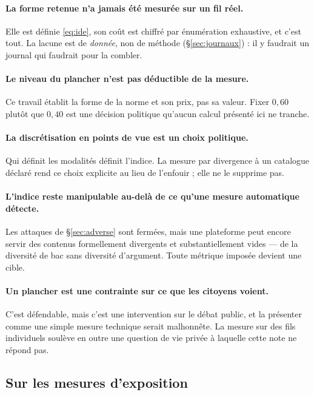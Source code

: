 \documentclass[11pt,a4paper]{article}
\begin{document}
\paragraph{La forme retenue n'a jamais été mesurée sur un fil réel.} Elle est définie
\eqref{eq:ide}, son coût est chiffré par énumération exhaustive, et c'est tout. La lacune est
de \emph{donnée}, non de méthode (\S\ref{sec:journaux}) : il y faudrait un journal qui
faudrait pour la combler.

\paragraph{Le niveau du plancher n'est pas déductible de la mesure.} Ce travail établit la
forme de la norme et son prix, pas sa valeur. Fixer $0{,}60$ plutôt que $0{,}40$ est une
décision politique qu'aucun calcul présenté ici ne tranche.

\paragraph{La discrétisation en points de vue est un choix politique.} Qui définit les
modalités définit l'indice. La mesure par divergence à un catalogue déclaré rend ce choix
explicite au lieu de l'enfouir ; elle ne le supprime pas.

\paragraph{L'indice reste manipulable au-delà de ce qu'une mesure automatique détecte.} Les
attaques de \S\ref{sec:adverse} sont fermées, mais une plateforme peut encore servir des
contenus formellement divergents et substantiellement vides --- de la diversité de bac sans
diversité d'argument. Toute métrique imposée devient une cible.

\paragraph{Un plancher est une contrainte sur ce que les citoyens voient.} C'est défendable,
mais c'est une intervention sur le débat public, et la présenter comme une simple mesure
technique serait malhonnête. La mesure sur des fils individuels soulève en outre une question
de vie privée à laquelle cette note ne répond pas.

\subsection{Sur les mesures d'exposition}
\end{document}
